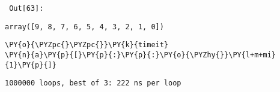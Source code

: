        {\par%
        \vspace{-1\smallerfontscale}%
        \noindent%
        \begin{minipage}{\cellleftmargin}%
    \hfill%
    {\smaller%
    \tt%
    \color{nbframe-out-prompt}%
    Out[63]:}%
    \hspace{\inputpadding}%
    \hspace{0em}%
    \hspace{3pt}%
    \end{minipage}%
        }%
    \begin{addmargin}[\cellleftmargin]{0em}%
    {\smaller%
    \vspace{-1\smallerfontscale}%
    
    
    
    \begin{verbatim}
array([9, 8, 7, 6, 5, 4, 3, 2, 1, 0])
    \end{verbatim}

    
}%
    \end{addmargin}%

{\par%
\vspace{-1\baselineskip}%
}%
\begin{notebookcell}[64]%
\begin{addmargin}[\cellleftmargin]{0em}%
{\smaller%
\par%
%
\vspace{-1\smallerfontscale}%
\begin{Verbatim}[commandchars=\\\{\}]
\PY{o}{\PYZpc{}\PYZpc{}}\PY{k}{timeit}
\PY{n}{a}\PY{p}{[}\PY{p}{:}\PY{p}{:}\PY{o}{\PYZhy{}}\PY{l+m+mi}{1}\PY{p}{]}
\end{Verbatim}
%
\par%
\vspace{-1\smallerfontscale}}%
\end{addmargin}
\end{notebookcell}

\par\vspace{1\smallerfontscale}%
    \begin{addmargin}[\cellleftmargin]{0em}%
    {\smaller%
    \vspace{-1\smallerfontscale}%
    
    \begin{Verbatim}[commandchars=\\\{\}]
1000000 loops, best of 3: 222 ns per loop
    \end{Verbatim}
}%
    \end{addmargin}%


